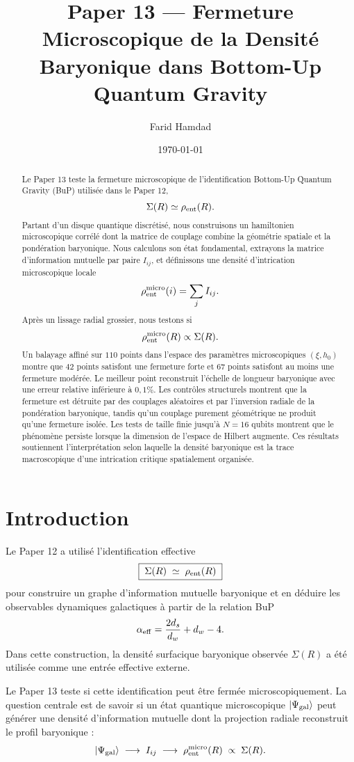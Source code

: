\documentclass[11pt]{article}
\title{
Paper 13 --- Fermeture Microscopique de la Densité Baryonique dans Bottom-Up Quantum Gravity
}
\author{
Farid Hamdad
}
\date{\today}
\begin{document}
\maketitle

\begin{abstract}
Le Paper 13 teste la fermeture microscopique de l'identification Bottom-Up Quantum Gravity (BuP) utilisée dans le Paper 12,
\[
\Sigma(R) \simeq \rho_{\rm ent}(R).
\]
Partant d'un disque quantique discrétisé, nous construisons un hamiltonien microscopique corrélé dont la matrice de couplage combine la géométrie spatiale et la pondération baryonique. Nous calculons son état fondamental, extrayons la matrice d'information mutuelle par paire \(I_{ij}\), et définissons une densité d'intrication microscopique locale
\[
\rho_{\rm ent}^{\rm micro}(i)=\sum_j I_{ij}.
\]
Après un lissage radial grossier, nous testons si
\[
\rho_{\rm ent}^{\rm micro}(R)\propto \Sigma(R).
\]
Un balayage affiné sur \(110\) points dans l'espace des paramètres microscopiques \((\xi, h_0)\) montre que \(42\) points satisfont une fermeture forte et \(67\) points satisfont au moins une fermeture modérée. Le meilleur point reconstruit l'échelle de longueur baryonique avec une erreur relative inférieure à \(0,1\%\). Les contrôles structurels montrent que la fermeture est détruite par des couplages aléatoires et par l'inversion radiale de la pondération baryonique, tandis qu'un couplage purement géométrique ne produit qu'une fermeture isolée. Les tests de taille finie jusqu'à \(N=16\) qubits montrent que le phénomène persiste lorsque la dimension de l'espace de Hilbert augmente. Ces résultats soutiennent l'interprétation selon laquelle la densité baryonique est la trace macroscopique d'une intrication critique spatialement organisée.
\end{abstract}

\section{Introduction}

Le Paper 12 a utilisé l'identification effective
\[
\boxed{\;\Sigma(R) \;\simeq\; \rho_{\rm ent}(R)\;}
\]
pour construire un graphe d'information mutuelle baryonique et en déduire les observables dynamiques galactiques à partir de la relation BuP
\[
\alpha_{\rm eff}
=
\frac{2d_s}{d_w}+d_w-4.
\]
Dans cette construction, la densité surfacique baryonique observée \(\Sigma(R)\) a été utilisée comme une entrée effective externe.

Le Paper 13 teste si cette identification peut être fermée microscopiquement. La question centrale est de savoir si un état quantique microscopique \(|\Psi_{\rm gal}\rangle\) peut générer une densité d'information mutuelle dont la projection radiale reconstruit le profil baryonique :
\[
|\Psi_{\rm gal}\rangle
\;\longrightarrow\;
I_{ij}
\;\longrightarrow\;
\rho_{\rm ent}^{\rm micro}(R)
\;\propto\;
\Sigma(R).
\]
\end{document}

